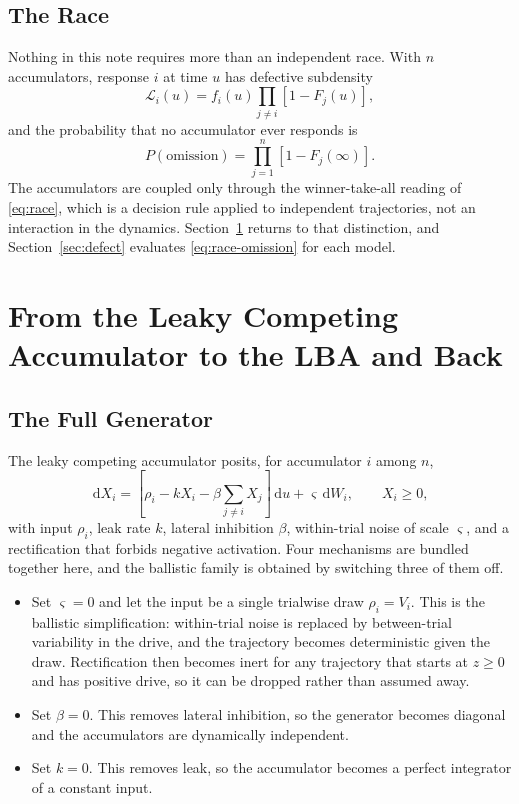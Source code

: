 \documentclass[12pt]{article}
\newcommand{\dd}{\,\mathrm{d}}
\theoremstyle{remark}
\begin{document}
\subsection{The Race}
Nothing in this note requires more than an independent race. With $n$ accumulators, response $i$ at time $u$ has defective subdensity
\begin{equation}
  \mathcal{L}_i(u) = f_i(u)\prod_{j \ne i}\left[1 - F_j(u)\right],
  \label{eq:race}
\end{equation}
and the probability that no accumulator ever responds is
\begin{equation}
  P(\text{omission}) = \prod_{j=1}^{n}\left[1 - F_j(\infty)\right].
  \label{eq:race-omission}
\end{equation}
The accumulators are coupled only through the winner-take-all reading of
\eqref{eq:race}, which is a decision rule applied to independent trajectories,
not an interaction in the dynamics. Section~\ref{sec:lca} returns to that distinction, and Section~\ref{sec:defect} evaluates
\eqref{eq:race-omission} for each model.

\section{From the Leaky Competing Accumulator to the LBA and Back}
\label{sec:lca}
\subsection{The Full Generator}
The leaky competing accumulator posits, for accumulator $i$ among $n$,
\begin{equation}
  \dd X_i = \left[\rho_i - k X_i - \beta\sum_{j\ne i} X_j\right]\dd u
            + \varsigma \dd W_i,
  \qquad
  X_i \ge 0,
  \label{eq:lca}
\end{equation}
with input $\rho_i$, leak rate $k$, lateral inhibition $\beta$, within-trial noise of scale $\varsigma$, and a rectification that forbids negative activation. Four mechanisms are bundled together here, and the ballistic family is obtained by switching three of them off.

\begin{itemize}
  \item Set $\varsigma = 0$ and let the input be a single trialwise draw $\rho_i = V_i$. This is the ballistic simplification: within-trial noise is replaced by between-trial variability in the drive, and the trajectory becomes deterministic given the draw. Rectification then becomes inert for any trajectory that starts at $z \ge 0$ and has positive drive, so it can be dropped rather than assumed away.
  \item Set $\beta = 0$. This removes lateral inhibition, so the generator becomes diagonal and the accumulators are dynamically independent.
  \item Set $k = 0$. This removes leak, so the accumulator becomes a perfect integrator of a constant input.
\end{itemize}
\end{document}
